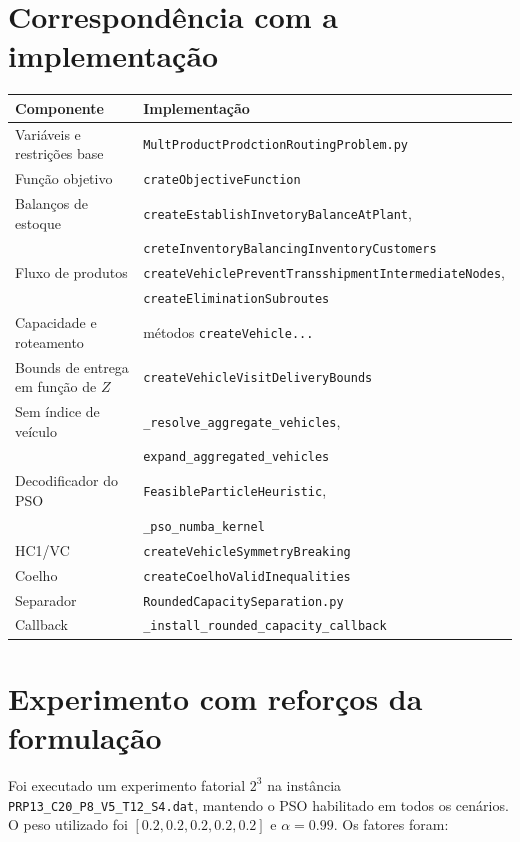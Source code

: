 \documentclass[11pt,a4paper]{article}
\begin{document}
\section{Correspondência com a implementação}

\begin{center}
\begin{tabular}{ll}
\toprule
Componente & Implementação \\
\midrule
Variáveis e restrições base & \texttt{MultProductProdctionRoutingProblem.py} \\
Função objetivo & \texttt{crateObjectiveFunction} \\
Balanços de estoque & \texttt{createEstablishInvetoryBalanceAtPlant},\\
& \texttt{creteInventoryBalancingInventoryCustomers} \\
Fluxo de produtos & \texttt{createVehiclePreventTransshipmentIntermediateNodes},\\
& \texttt{createEliminationSubroutes} \\
Capacidade e roteamento & métodos \texttt{createVehicle...} \\
Bounds de entrega em função de $Z$ & \texttt{createVehicleVisitDeliveryBounds} \\
Sem índice de veículo & \texttt{\_resolve\_aggregate\_vehicles},\\
& \texttt{expand\_aggregated\_vehicles} \\
Decodificador do PSO & \texttt{FeasibleParticleHeuristic},\\
& \texttt{\_pso\_numba\_kernel} \\
HC1/VC & \texttt{createVehicleSymmetryBreaking} \\
Coelho & \texttt{createCoelhoValidInequalities} \\
Separador & \texttt{RoundedCapacitySeparation.py} \\
Callback & \texttt{\_install\_rounded\_capacity\_callback} \\
\bottomrule
\end{tabular}
\end{center}

\section{Experimento com reforços da formulação}

Foi executado um experimento fatorial $2^3$ na instância
\texttt{PRP13\_C20\_P8\_V5\_T12\_S4.dat}, mantendo o PSO habilitado em todos
os cenários. O peso utilizado foi
$[0.2,0.2,0.2,0.2,0.2]$ e $\alpha=0.99$. Os fatores foram:
\end{document}
